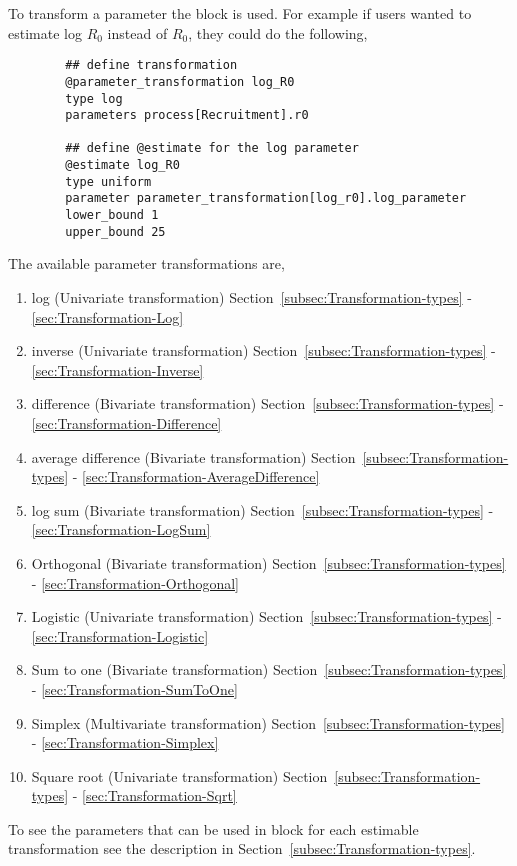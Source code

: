 To transform a parameter the  block is used. For example if users wanted to estimate log \(R_0\) instead of \(R_0\), they could do the following,
{\small{\begin{verbatim}
		## define transformation
		@parameter_transformation log_R0
		type log
		parameters process[Recruitment].r0

		## define @estimate for the log parameter
		@estimate log_R0
		type uniform
		parameter parameter_transformation[log_r0].log_parameter
		lower_bound 1
		upper_bound 25
\end{verbatim}}}
%
The available parameter transformations are,
\begin{enumerate}
	\item log (Univariate transformation) Section~\ref{subsec:Transformation-types} - \ref{sec:Transformation-Log}
	\item inverse (Univariate transformation) Section~\ref{subsec:Transformation-types} - \ref{sec:Transformation-Inverse}
	\item difference (Bivariate transformation) Section~\ref{subsec:Transformation-types} - \ref{sec:Transformation-Difference}
	\item average difference (Bivariate transformation) Section~\ref{subsec:Transformation-types} - \ref{sec:Transformation-AverageDifference}
	\item log sum (Bivariate transformation) Section~\ref{subsec:Transformation-types} - \ref{sec:Transformation-LogSum}	
	\item Orthogonal (Bivariate transformation) Section~\ref{subsec:Transformation-types} - \ref{sec:Transformation-Orthogonal}
	\item Logistic (Univariate transformation) Section~\ref{subsec:Transformation-types} - \ref{sec:Transformation-Logistic}
	\item Sum to one (Bivariate transformation) Section~\ref{subsec:Transformation-types} - \ref{sec:Transformation-SumToOne}
	\item Simplex (Multivariate transformation) Section~\ref{subsec:Transformation-types} - \ref{sec:Transformation-Simplex}	
	\item Square root (Univariate transformation) Section~\ref{subsec:Transformation-types} - \ref{sec:Transformation-Sqrt}	
\end{enumerate}

To see the parameters that can be used in  block for each estimable transformation see the  description in Section~\ref{subsec:Transformation-types}.

